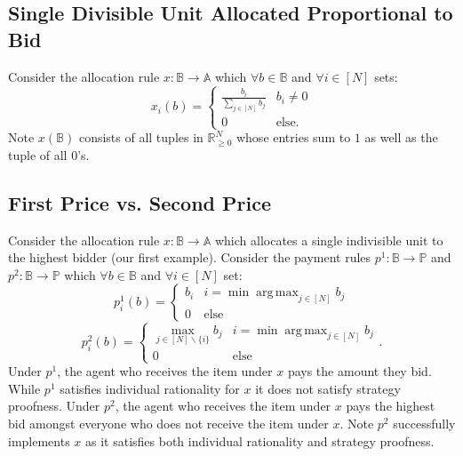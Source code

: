 \documentclass[11pt]{article}
\DeclareMathOperator*{\argmax}{arg\,max}
\theoremstyle{definition}
\theoremstyle{plain}
\begin{document}
\subsection*{Single Divisible Unit Allocated Proportional to Bid}
Consider the allocation rule $x:\mathbb{B} \to \mathbb{A}$ which $\forall b \in
\mathbb{B}$ and $\forall i \in [N]$ sets:
$$x_i(b)=\begin{cases} \frac{b_i}{\sum_{j \in [N]} b_j} & b_i \neq 0 \\ 0 &
\text{else}. \end{cases}$$
Note $x(\mathbb{B})$ consists of all tuples in $\mathbb{R}^N_{\geq 0}$ whose
entries sum to $1$ as well as the tuple of all $0$'s.
\subsection*{First Price vs. Second Price}
Consider the allocation rule $x: \mathbb{B} \to \mathbb{A}$ which allocates a
single indivisible unit to the highest bidder (our first example). Consider the
payment rules $p^1: \mathbb{B} \to \mathbb{P}$ and $p^2: \mathbb{B} \to \mathbb{P}$
which $\forall b \in \mathbb{B}$ and $\forall i \in [N]$ set:
$$p^1_i(b)=\begin{cases}b_i & i=\min \argmax_{j \in [N]} b_j \\ 0 & \text{else}
\end{cases}$$
$$p^2_i(b)=\begin{cases} \max_{j \in [N] \backslash \{i\}} b_j & i=\min \argmax_{j
\in [N]} b_j \\ 0 & \text{else} \end{cases}.$$
Under $p^1$, the agent who receives the item under $x$ pays the amount they bid.
While $p^1$ satisfies individual rationality for $x$ it does not satisfy strategy
proofness. Under $p^2$, the agent who receives the item under $x$ pays the highest
bid amongst everyone who does not receive the item under $x$. Note $p^2$
successfully implements $x$ as it satisfies both individual rationality and
strategy proofness.
\end{document}
